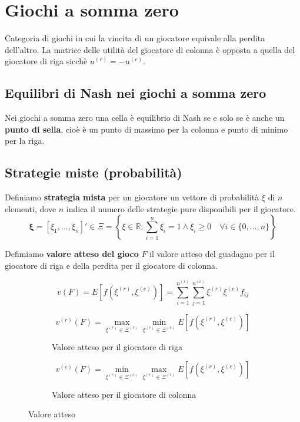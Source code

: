 \documentclass[\main/main.tex]{subfiles}
\begin{document}
\chapter{Giochi a somma zero}
Categoria di giochi in cui la vincita di un giocatore equivale alla perdita dell'altro. La matrice delle utilità del giocatore di colonna è opposta a quella del giocatore di riga sicchè $u^{(r)} = -u^{(c)}$.

\section{Equilibri di Nash nei giochi a somma zero}
Nei giochi a somma zero una cella è equilibrio di Nash se e solo se è anche un \textbf{punto di sella}, cioè è un punto di massimo per la colonna e punto di minimo per la riga.

\section{Strategie miste (probabilità)}
\begin{definition}
  Definiamo \textbf{strategia mista} per un giocatore un vettore di probabilità $\xi$ di $n$ elementi, dove $n$ indica il numero delle strategie pure disponibili per il giocatore.
  \[
    \bm{\xi} = [\xi_1, \ldots, \xi_n]' \in \Xi = \left\{ \xi \in \mathbb{R}: \sum_{i=1}^n \xi_i = 1 \land \xi_i \geq 0 \quad \forall i \in \{0,\ldots,n\} \right\}
  \]
\end{definition}

\begin{definition}
  Defimiamo \textbf{valore atteso del gioco} $F$ il valore atteso del guadagno per il giocatore di riga e della perdita per il giocatore di colonna.

  \[
    v(F) = E\left[ f(\xi^{(r)},\xi^{(c)}) \right] = \sum_{i=1}^{n^{(r)}}\sum_{j=1}^{n^{(c)}} \xi^{(r)}\xi^{(c)}f_{ij}
  \]

  \begin{figure}
    \begin{subfigure}{0.49\textwidth}
      \[
        v^{(r)}(F) = \max_{\xi^{(r)} \in \Xi^{(r)}} \min_{\xi^{(c)} \in \Xi^{(c)}} E\left[ f(\xi^{(r)},\xi^{(c)}) \right]
      \]
      \caption{Valore atteso per il giocatore di riga}
    \end{subfigure}
    \begin{subfigure}{0.49\textwidth}
      \[
        v^{(c)}(F) = \min_{\xi^{(c)} \in \Xi^{(c)}} \max_{\xi^{(r)} \in \Xi^{(r)}} E\left[ f(\xi^{(r)},\xi^{(c)}) \right]
      \]
      \caption{Valore atteso per il giocatore di colonna}
    \end{subfigure}
    \caption{Valore atteso}
  \end{figure}
\end{definition}
\end{document}
